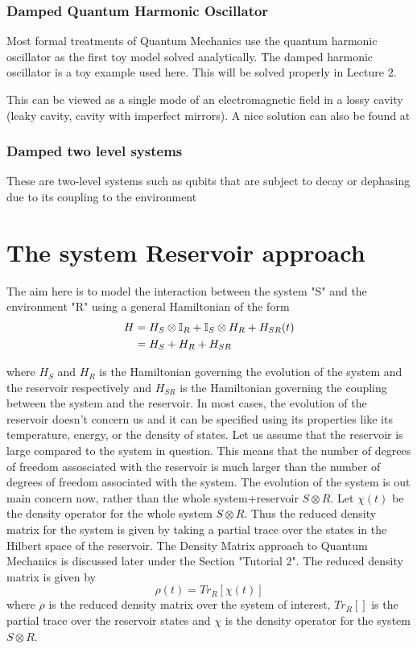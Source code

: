 \documentclass{scrartcl}
\newcommand{\1}{\mathbbm{1}}
\begin{document}
\subsubsection{Damped Quantum Harmonic Oscillator}
Most formal treatments of Quantum Mechanics use the quantum harmonic oscillator as the first toy model solved analytically. The damped harmonic oscillator is a toy example used here. This will be solved properly in Lecture 2. 

This can be viewed as a single mode of an electromagnetic field in a lossy cavity (leaky cavity, cavity with imperfect mirrors). A nice solution can also be found at
\subsubsection{Damped two level systems}
These are two-level systems such as qubits that are subject to decay or dephasing due to its coupling to the environment
\section{The system Reservoir approach}
The aim here is to model the interaction between the system "S" and the environment "R" using a general Hamiltonian of the form
\begin{align}
    H  &= H_S \otimes \mathbb I_R + \mathbb I_S \otimes H_R + H_{SR}(t) \\ \nonumber
    & = H_S + H_R + H_{SR}
\end{align}

where $H_S$ and $H_R$ is the Hamiltonian governing the evolution of the system and the reservoir respectively and $H_{SR}$ is the Hamiltonian governing the coupling between the system and the reservoir. In most cases, the evolution of the reservoir doesn't concern us and it can be specified using its properties like its temperature, energy, or the density of states. 
Let us assume that the reservoir is large compared to the system in question. This means that the number of 
degrees of freedom assosciated with the reservoir is much larger than the number of degrees of freedom associated with the system.
The evolution of the system is out main concern now, rather than the whole system+reservoir $S \otimes R$. Let $\chi (t)$ be the density operator for the whole system $S\otimes R$. Thus the reduced density matrix for the system is given by taking a partial trace over the states in the Hilbert space of the reservoir. The Density Matrix approach to Quantum Mechanics is discussed later under the Section "Tutorial 2". The reduced density matrix is given by 
\begin{equation}
    \rho (t) = Tr_R[\chi (t)]
\end{equation}
where $\rho$ is the reduced density matrix over the system of interest, $Tr_R[]$ is the partial trace over the reservoir states and $\chi$ is the density operator for the system $S\otimes R$.
\end{document}
